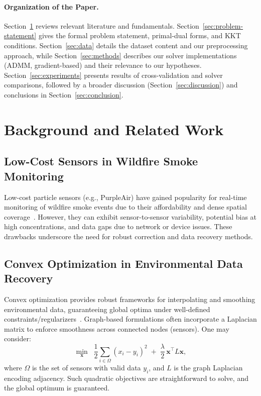 \documentclass[12pt]{article}                                %
\begin{document}
\paragraph{Organization of the Paper.} %
Section~\ref{sec:background} reviews relevant literature and fundamentals. 
Section~\ref{sec:problem-statement} gives the formal problem statement, primal-dual forms, 
and KKT conditions. Section~\ref{sec:data} details the dataset content and our preprocessing 
approach, while Section~\ref{sec:methods} describes our solver implementations (ADMM, 
gradient-based) and their relevance to our hypotheses. Section~\ref{sec:experiments} presents 
results of cross-validation and solver comparisons, followed by a broader discussion 
(Section~\ref{sec:discussion}) and conclusions in Section~\ref{sec:conclusion}.

\section{Background and Related Work}
\label{sec:background}        %

\subsection{Low-Cost Sensors in Wildfire Smoke Monitoring}    %
Low-cost particle sensors (e.g., PurpleAir) have gained popularity for real-time monitoring of 
wildfire smoke events due to their affordability and dense spatial coverage~\cite{Barkjohn2022}. 
However, they can exhibit sensor-to-sensor variability, potential bias at high concentrations, 
and data gaps due to network or device issues. These drawbacks underscore the need for robust 
correction and data recovery methods.

\subsection{Convex Optimization in Environmental Data Recovery}   %
Convex optimization provides robust frameworks for interpolating and smoothing environmental 
data, guaranteeing global optima under well-defined constraints/regularizers~\cite{BoydADMM}. 
Graph-based formulations often incorporate a Laplacian matrix to enforce smoothness across 
connected nodes (sensors). One may consider:
\begin{equation}
    \label{eq:laplacian-smoothing}
    \min_{\mathbf{x}} \;\; \frac{1}{2}\sum_{i \in \Omega} (x_i - y_i)^2 
    \;+\; \frac{\lambda}{2}\,\mathbf{x}^\top L \mathbf{x},
\end{equation}
where $\Omega$ is the set of sensors with valid data $y_i$, and $L$ is the graph Laplacian 
encoding adjacency. Such quadratic objectives are straightforward to solve, and the global 
optimum is guaranteed.
\end{document}

